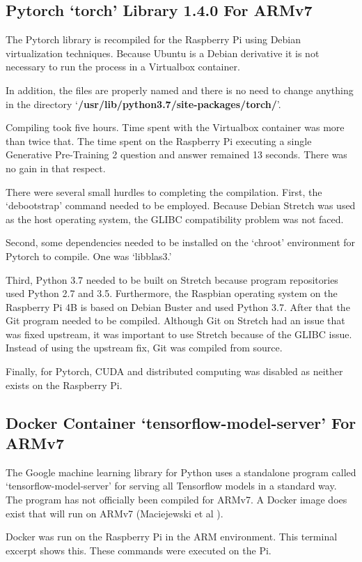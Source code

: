 \subsection{Pytorch `torch' Library 1.4.0 For ARMv7}
The Pytorch library is recompiled for the Raspberry Pi using Debian virtualization techniques. Because Ubuntu is a Debian derivative it is not necessary to run the process in a Virtualbox container. 

In addition, the files are properly named and there is no need to change anything in the directory `\textbf{/usr/lib/python3.7/site-packages/torch/}'. 

Compiling took five hours. Time spent with the Virtualbox container was more than twice that. The time spent on the Raspberry Pi executing a single Generative Pre-Training 2 question and answer remained 13 seconds. There was no gain in that respect.

There were several small hurdles to completing the compilation. First, the `debootstrap' command needed to be employed. Because Debian Stretch was used as the host operating system, the GLIBC compatibility problem was not faced. 

Second, some dependencies needed to be installed on the `chroot' environment for Pytorch to compile. One was `libblas3.'

Third, Python 3.7 needed to be built on Stretch because program repositories used Python 2.7 and 3.5. Furthermore, the Raspbian operating system on the Raspberry Pi 4B is based on Debian Buster and used Python 3.7. After that the Git program needed to be compiled. Although Git on Stretch had an issue that was fixed upstream, it was important to use Stretch because of the GLIBC issue. Instead of using the upstream fix, Git was compiled from source. 

Finally, for Pytorch, CUDA and distributed computing was disabled as neither exists on the Raspberry Pi.

\subsection{Docker Container `tensorflow-model-server' For ARMv7}
The Google machine learning library for Python uses a standalone program called `tensorflow-model-server' for serving all Tensorflow models in a standard way. The program has not officially been compiled for ARMv7. A Docker image does exist that will run on ARMv7 (Maciejewski et al \cite{2020Maciejewski}).

Docker was run on the Raspberry Pi in the ARM environment. This terminal excerpt shows this. These commands were executed on the Pi.

